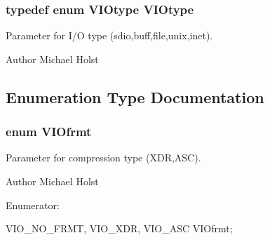 \subsubsection[{VIOtype}]{\setlength{\rightskip}{0pt plus 5cm}typedef enum {\bf VIOtype}  {\bf VIOtype}}\label{a00028_gaf946e6d7d3ed8f5bdb3de70792477fa4}


Parameter for I/O type (sdio,buff,file,unix,inet). 

\begin{DoxyAuthor}{Author}
Michael Holst 
\end{DoxyAuthor}


\subsection{Enumeration Type Documentation}
\subsubsection[{VIOfrmt}]{\setlength{\rightskip}{0pt plus 5cm}enum {\bf VIOfrmt}}\label{a00028_gabfa72aea464435d52c14c43ebd5e363b}


Parameter for compression type (XDR,ASC). 

\begin{DoxyAuthor}{Author}
Michael Holst 
\end{DoxyAuthor}
\begin{Desc}
\item[Enumerator: ]\par
\begin{description}
\item[{\em 
VIO\_\-NO\_\-FRMT\label{a00028_ggabfa72aea464435d52c14c43ebd5e363bade52aaa65f920c341c443993f0898b73}
}]\item[{\em 
VIO\_\-XDR\label{a00028_ggabfa72aea464435d52c14c43ebd5e363ba35f912228eb6c27fc632520ae9629924}
}]\item[{\em 
VIO\_\-ASC\label{a00028_ggabfa72aea464435d52c14c43ebd5e363baec02355c47d63dead444522a814209f4}
}]\end{description}
\end{Desc}




\begin{DoxyCode}
                     {
    VIO_NO_FRMT,
    VIO_XDR,
    VIO_ASC
} VIOfrmt;
\end{DoxyCode}


